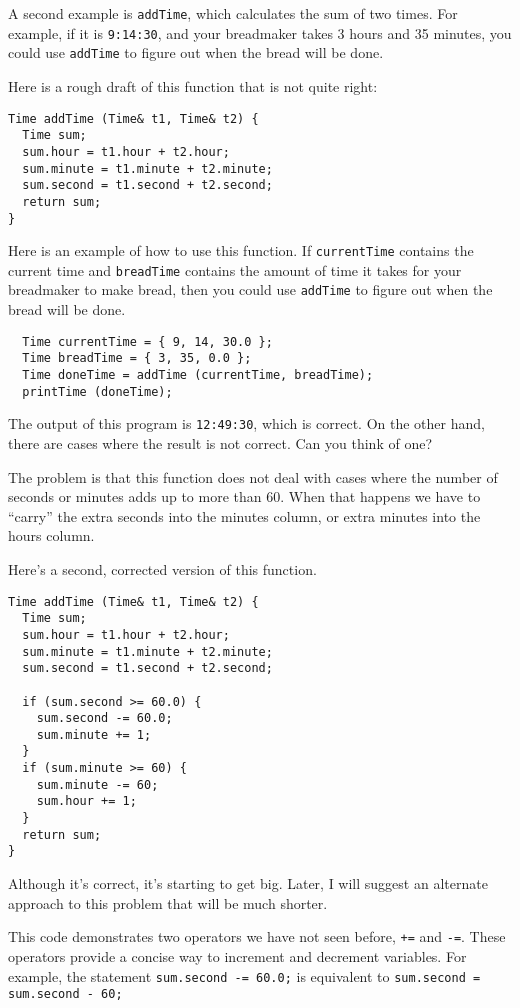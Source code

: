 A second example is {\tt addTime}, which calculates the sum of two
times.  For example, if it is {\tt 9:14:30}, and your breadmaker takes
3 hours and 35 minutes, you could use {\tt addTime} to figure out when
the bread will be done.

Here is a rough draft of this function that is not quite right:

\begin{verbatim}
Time addTime (Time& t1, Time& t2) {
  Time sum;
  sum.hour = t1.hour + t2.hour;
  sum.minute = t1.minute + t2.minute;
  sum.second = t1.second + t2.second;
  return sum;
}
\end{verbatim}
%
Here is an example of how to use this function.  If {\tt currentTime}
contains the current time and {\tt breadTime} contains the amount
of time it takes for your breadmaker to make bread, then you
could use {\tt addTime} to figure out when the bread will be
done.

\begin{verbatim}
  Time currentTime = { 9, 14, 30.0 };
  Time breadTime = { 3, 35, 0.0 };
  Time doneTime = addTime (currentTime, breadTime);
  printTime (doneTime);
\end{verbatim}
%
The output of this program is {\tt 12:49:30}, which is
correct.  On the other hand, there are cases where the result
is not correct.  Can you think of one?

The problem is that this function does not deal with cases
where the number of seconds or minutes adds up to more than
60.  When that happens we have to ``carry'' the extra seconds
into the minutes column, or extra minutes into the hours
column.

Here's a second, corrected version of this function.

\begin{verbatim}
Time addTime (Time& t1, Time& t2) {
  Time sum;
  sum.hour = t1.hour + t2.hour;
  sum.minute = t1.minute + t2.minute;
  sum.second = t1.second + t2.second;

  if (sum.second >= 60.0) {
    sum.second -= 60.0;
    sum.minute += 1;
  }
  if (sum.minute >= 60) {
    sum.minute -= 60;
    sum.hour += 1;
  }
  return sum;
}
\end{verbatim}
%
Although it's correct, it's starting to get big.  Later,
I will suggest an alternate approach to this problem that
will be much shorter.


This code demonstrates two operators we have not seen before, {\tt +=}
and {\tt -=}.  These operators provide a concise way to increment and
decrement variables.  For example, the statement {\tt sum.second -=
60.0;} is equivalent to {\tt sum.second = sum.second - 60;}

